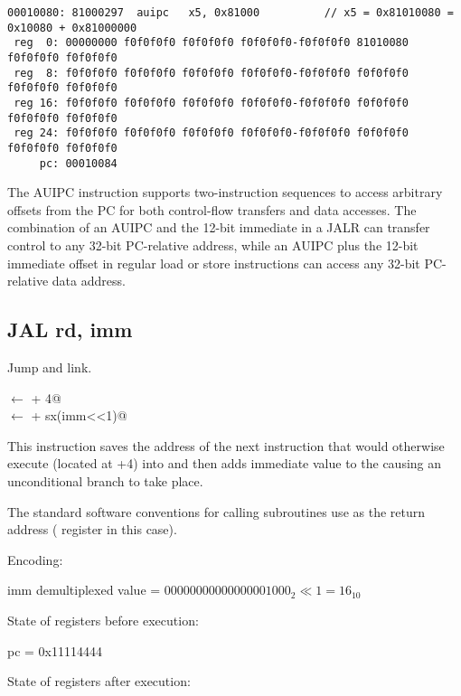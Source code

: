 \begin{verbatim}
00010080: 81000297  auipc   x5, 0x81000          // x5 = 0x81010080 = 0x10080 + 0x81000000
 reg  0: 00000000 f0f0f0f0 f0f0f0f0 f0f0f0f0-f0f0f0f0 81010080 f0f0f0f0 f0f0f0f0
 reg  8: f0f0f0f0 f0f0f0f0 f0f0f0f0 f0f0f0f0-f0f0f0f0 f0f0f0f0 f0f0f0f0 f0f0f0f0
 reg 16: f0f0f0f0 f0f0f0f0 f0f0f0f0 f0f0f0f0-f0f0f0f0 f0f0f0f0 f0f0f0f0 f0f0f0f0
 reg 24: f0f0f0f0 f0f0f0f0 f0f0f0f0 f0f0f0f0-f0f0f0f0 f0f0f0f0 f0f0f0f0 f0f0f0f0
     pc: 00010084
\end{verbatim}


The AUIPC instruction supports two-instruction sequences to access arbitrary 
offsets from the PC for both control-flow transfers and data accesses. 
The combination of an AUIPC and the 12-bit immediate in a JALR can transfer 
control to any 32-bit PC-relative address, while an AUIPC plus the 12-bit 
immediate offset in regular load or store instructions can access any 32-bit 
PC-relative data address.~\cite[p.~14]{rvismv1v22:2017}


\subsection{JAL rd, imm}

Jump and link.

\verb@rd@ $\leftarrow$ \verb@pc + 4@\\
\verb@pc@ $\leftarrow$ \verb@pc + sx(imm<<1)@

This instruction saves the address of the next instruction
that would otherwise execute (located at +4) into 
 and then adds immediate value to the  causing
an unconditional branch to take place.

The standard software conventions for calling subroutines
use  as the return address ( register in this 
case).~\cite[p.~16]{rvismv1v22:2017}


Encoding:


imm demultiplexed value = $00000000000000001000_2 \ll 1 = 16_{10}$


State of registers before execution:

pc = 0x11114444

State of registers after execution:

